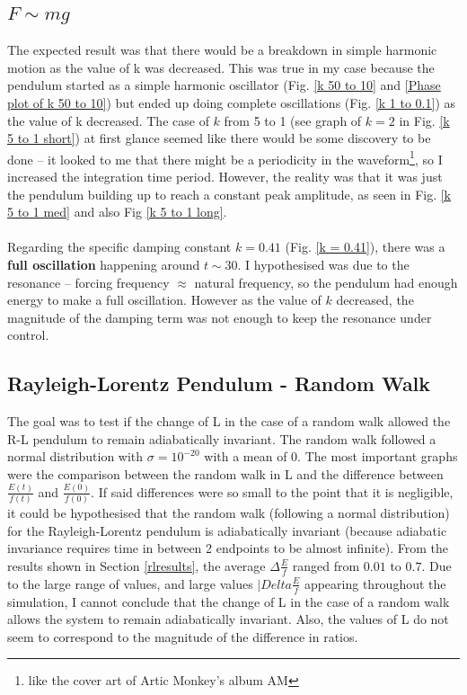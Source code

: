 \documentclass[10pt, twocolumn]{article}
\begin{document}
\subsection{$F \sim{mg}$}{\label{analysisFmg}}
The expected result was that there would be a breakdown in simple harmonic motion as the value of k was decreased. This was true in my case because the pendulum started as a simple harmonic oscillator (Fig. \ref{k 50 to 10} and \ref{Phase plot of k 50 to 10}) but ended up doing complete oscillations (Fig. \ref{k 1 to 0.1}) as the value of k decreased. The case of $k$ from 5 to 1 (see graph of $k = 2$ in Fig. \ref{k 5 to 1 short}) at first glance seemed like there would be some discovery to be done -- it looked to me that there might be a periodicity in the waveform\footnote{like the cover art of Artic Monkey's album AM}, so I increased the integration time period. However, the reality was that it was just the pendulum building up to reach a constant peak amplitude, as seen in Fig. \ref{k 5 to 1 med} and also Fig \ref{k 5 to 1 long}.\\
\\
Regarding the specific damping constant $k = 0.41$ (Fig. \ref{k = 0.41}), there was a \textbf{full oscillation} happening around $t \sim{30}$. I hypothesised was due to the resonance -- forcing frequency $\approx$ natural frequency, so the pendulum had enough energy to make a full oscillation. However as the value of $k$ decreased, the magnitude of the damping term was not enough to keep the resonance under control.

\subsection{Rayleigh-Lorentz Pendulum - Random Walk}
The goal was to test if the change of L in the case of a random walk allowed the R-L pendulum to remain adiabatically invariant. The random walk followed a normal distribution with $\sigma = 10^{-20}$ with a mean of 0. The most important graphs were the comparison between the random walk in L and the difference between $\frac{E(t)}{f(t)}$ and $\frac{E(0)}{f(0)}$. If said differences were so small to the point that it is negligible, it could be hypothesised that the random walk (following a normal distribution) for the Rayleigh-Lorentz pendulum is adiabatically invariant (because adiabatic invariance requires time in between 2 endpoints to be almost infinite). From the results shown in Section \ref{rlresults}, the average $\Delta\frac{E}{f}$ ranged from $0.01$ to $0.7$. Due to the large range of values, and large values $|Delta\frac{E}{f}$ appearing throughout the simulation, I cannot conclude that the change of L in the case of a random walk allows the system to remain adiabatically invariant. Also, the values of L do not seem to correspond to the magnitude of the difference in ratios.
\end{document}
